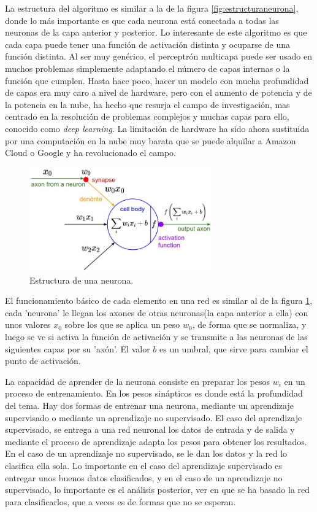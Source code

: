 \documentclass[12pt]{book}
\numberwithin{equation}{section}
\begin{document}
La estructura del algoritmo es similar a la de la figura \ref{fig:estructuraneurona}, donde lo más importante es que cada neurona está conectada a todas las neuronas de la capa anterior y posterior. Lo interesante de este algoritmo es que cada capa puede tener una función de activación distinta y ocuparse de una función distinta. Al ser muy genérico, el perceptrón multicapa puede ser usado en muchos problemas simplemente adaptando el número de capas internas o la función que cumplen. Hasta hace poco, hacer un modelo con mucha profundidad de capas era muy caro a nivel de hardware, pero con el aumento de potencia y de la potencia en la nube, ha hecho que resurja el campo de investigación, mas centrado en la resolución de problemas complejos y muchas capas para ello, conocido como \textit{deep learning}. La limitación de hardware ha sido ahora sustituida por una computación en la nube muy barata que se puede alquilar a Amazon Cloud o Google y ha revolucionado el campo.

\begin{figure}[h]
    \centering
    \includegraphics[width=0.7\textwidth]{neuron.jpg}
    \caption{Estructura de una neurona.}
    \label{fig:estructura}
\end{figure}

El funcionamiento básico de cada elemento en una red es similar al de la figura \ref{fig:estructura}, cada 'neurona' le llegan los axones de otras neuronas(la capa anterior a ella) con unos valores $x_0$ sobre los que se aplica un peso $w_0$, de forma que se normaliza, y luego se ve si activa la función de activación y se transmite a las neuronas de las siguientes capas por su 'axón'. El valor $b$ es un umbral, que sirve para cambiar el punto de activación.

La capacidad de aprender de la neurona consiste en preparar los pesos $w_i$ en un proceso de entrenamiento. En los pesos sinápticos es donde está la profundidad del tema. Hay dos formas de entrenar una neurona, mediante un aprendizaje supervisado o mediante un aprendizaje no supervisado. El caso del aprendizaje supervisado, se entrega a una red neuronal los datos de entrada y de salida y mediante el proceso de aprendizaje adapta los pesos para obtener los resultados. En el caso de un aprendizaje no supervisado, se le dan los datos y la red lo clasifica ella sola. Lo importante en el caso del aprendizaje supervisado es entregar unos buenos datos clasificados, y en el caso de un aprendizaje no supervisado, lo importante es el análisis posterior, ver en que se ha basado la red para clasificarlos, que a veces es de formas que no se esperan.
\end{document}
